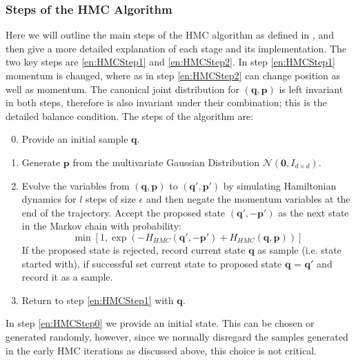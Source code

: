 \documentclass[12pt]{article}
\begin{document}
            \subsubsection{Steps of the HMC Algorithm}
            Here we will outline the main steps of the HMC algorithm as defined in \cite{duane_kennedy_pendleton_roweth_1987}, \cite{kennedy_pendleton_2001} and \cite{neal_2011} then give a more detailed explanation of each stage and its implementation. The two key steps are \ref{en:HMCStep1} and \ref{en:HMCStep2}. In step \ref{en:HMCStep1} momentum is changed, where as in step \ref{en:HMCStep2} can change position as well as momentum. The canonical joint distribution for $\left(\bm{q},\bm{p}\right)$ is left invariant in both steps, therefore is also invariant under their combination; this is the detailed balance condition. The steps of the algorithm are:
            \begin{enumerate}
                \setcounter{enumi}{-1}
                \item \label{en:HMCStep0} Provide an initial sample $\bm{q}$.
                \item \label{en:HMCStep1} Generate $\bm{p}$ from the multivariate Gaussian Distribution $\mathcal{N}\left(\bm{0},I_{d\times d}\right)$.
                \item \label{en:HMCStep2} Evolve the variables from $\left(\bm{q},\bm{p}\right)$ to $\left(\bm{q}',\bm{p}'\right)$ by simulating Hamiltonian dynamics for $l$ steps of size $\epsilon$ and then negate the momentum variables at the end of the trajectory. Accept the proposed state $\left(\bm{q}',-\bm{p}'\right)$ as the next state in the Markov chain with probability:
                        \begin{equation*}
                            \min{\left[1,\exp{\left(-H_{HMC}\left(\bm{q}',-\bm{p}'\right)+ \allowbreak H_{HMC}\left(\bm{q},\bm{p}\right)\right)}\right]}
                        \end{equation*}
                        If the proposed state is rejected, record current state $\bm{q}$ as sample (i.e. state started with), if successful set current state to proposed state $\bm{q}$ = $\bm{q}'$ and record it as a sample.
                \item \label{en:HMCStep5} Return to step \ref{en:HMCStep1} with $\bm{q}$.
            \end{enumerate}

            In step \ref{en:HMCStep0} we provide an initial state. This can be chosen or generated randomly, however, since we normally disregard the samples generated in the early HMC iterations as discussed above, this choice is not critical. 
\end{document}
